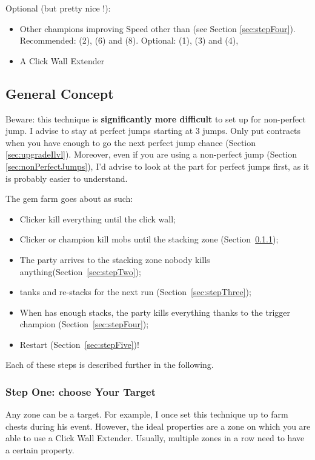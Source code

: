 \documentclass{article}
\begin{document}
Optional (but pretty nice !):
\begin{itemize}
    \item Other champions improving Speed other than \briv (see Section \ref{sec:stepFour}).
    Recommended: \widdle (2), \shandie (6) and \hewmaan (8).
    Optional: \deekin (1), \nahara (3) and \sentry (4), 
    \item A Click Wall Extender
\end{itemize}
 


\subsection{General Concept}

Beware: this technique is \textbf{significantly more difficult} to set up for non-perfect jump.
I advise to stay at perfect jumps starting at 3 jumps.
Only put contracts when you have enough to go the next perfect jump chance (Section \ref{sec:upgradeIlvl}).
Moreover, even if you are using a non-perfect jump \briv (Section \ref{sec:nonPerfectJumps}), I'd advise to look at the part for perfect jumps first, as it is probably easier to understand.

The gem farm goes about as such:
\begin{itemize}
    \item Clicker kill everything until the click wall;
    \item Clicker or champion kill mobs until the stacking zone (Section~\ref{sec:stepOne});
    \item The party arrives to the stacking zone nobody kills anything(Section~\ref{sec:stepTwo});
    \item \briv tanks and re-stacks for the next run (Section~\ref{sec:stepThree});
    \item When \briv has enough stacks, the party kills everything thanks to the trigger champion (Section~\ref{sec:stepFour});
    \item Restart (Section~\ref{sec:stepFive})!
\end{itemize}

Each of these steps is described further in the following.

\subsubsection{Step One: choose Your Target}
\label{sec:stepOne}

Any zone can be a target.
For example, I once set this technique up to farm \briv chests during his event.
However, the ideal properties are a zone on which you are able to use a Click Wall Extender.
Usually, multiple zones in a row need to have a certain property.
\end{document}
